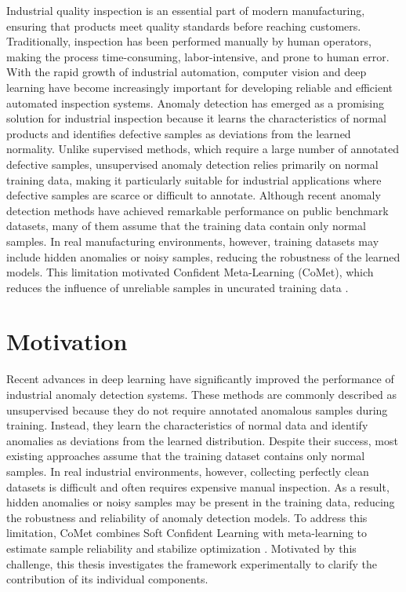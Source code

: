 \documentclass[12pt,openany,oneside]{book}
\begin{document}
Industrial quality inspection is an essential part of modern manufacturing, ensuring that products meet quality standards before reaching customers. Traditionally, inspection has been performed manually by human operators, making the process time-consuming, labor-intensive, and prone to human error. With the rapid growth of industrial automation, computer vision and deep learning have become increasingly important for developing reliable and efficient automated inspection systems.
Anomaly detection has emerged as a promising solution for industrial inspection because it learns the characteristics of normal products and identifies defective samples as deviations from the learned normality. Unlike supervised methods, which require a large number of annotated defective samples, unsupervised anomaly detection relies primarily on normal training data, making it particularly suitable for industrial applications where defective samples are scarce or difficult to annotate.
Although recent anomaly detection methods have achieved remarkable performance on public benchmark datasets, many of them assume that the training data contain only normal samples. In real manufacturing environments, however, training datasets may include hidden anomalies or noisy samples, reducing the robustness of the learned models. This limitation motivated Confident Meta-Learning (CoMet), which reduces the influence of unreliable samples in uncurated training data \cite{aqeel2025comet}.

\section{Motivation}

Recent advances in deep learning have significantly improved the performance of industrial anomaly detection systems. These methods are commonly described as unsupervised because they do not require annotated anomalous samples during training. Instead, they learn the characteristics of normal data and identify anomalies as deviations from the learned distribution.
Despite their success, most existing approaches assume that the training dataset contains only normal samples. In real industrial environments, however, collecting perfectly clean datasets is difficult and often requires expensive manual inspection. As a result, hidden anomalies or noisy samples may be present in the training data, reducing the robustness and reliability of anomaly detection models.
To address this limitation, CoMet combines Soft Confident Learning with meta-learning to estimate sample reliability and stabilize optimization \cite{aqeel2025comet}. Motivated by this challenge, this thesis investigates the framework experimentally to clarify the contribution of its individual components.
\end{document}
